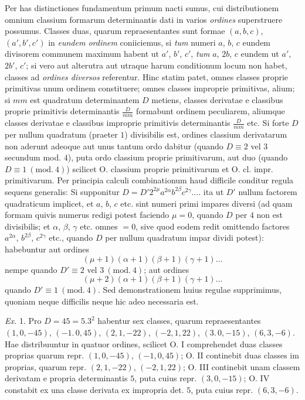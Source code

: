 Per has distinctiones fundamentum primum nacti sumus, cui distributionem omnium classium formarum determinantis dati in varios \textit{ordines} superstruere possumus. Classes duas, quarum repraesentantes sunt formae $(a,b,c)$, $(a',b',c')$ in \textit{eundem ordinem} coniiciemus, si \textit{tum} numeri $a$, $b$, $c$ eundem divisorem communem maximum habent ut $a'$, $b'$, $c'$, \textit{tum} $a$, $2b$, $c$ eundem ut $a'$, $2b'$, $c'$; si vero aut alterutra aut utraque harum conditionum locum non habet, classes ad \textit{ordines diversos} referentur. Hinc statim patet, omnes classes proprie primitivas unum ordinem constituere; omnes classes improprie primitivas, alium; si $mm$ est quadratum determinantem $D$ metiens, classes derivatae e classibus proprie primitivis determinantis $\frac{D}{mm}$ formabunt ordinem peculiarem, aliumque classes derivatae e classibus improprie primitivis determinantis $\frac{D}{mm}$ etc. Si forte $D$ per nullum quadratum (praeter $1$) divisibilis est, ordines classium derivatarum non aderunt adeoque aut unus tantum ordo dabitur (quando $D\equiv2$ vel $3$ secundum mod. $4$), puta ordo classium proprie primitivarum, aut duo (quando $D\equiv1\ (\mathrm{mod.}\ 4)$) scilicet O. classium proprie primitivarum et O. cl. impr. primitivarum. Per principia calculi combinationum haud difficile conditur regula sequens generalis: Si supponitur $D=D'2^{2\mu}a^{2\alpha}b^{2\beta}c^{2\gamma}\ldots.$ ita ut $D'$ nullum factorem quadraticum implicet, et $a$, $b$, $c$ etc. sint numeri primi impares diversi (ad quam formam quivis numerus redigi potest faciendo $\mu=0$, quando $D$ per $4$ non est divisibilis; et $\alpha$, $\beta$, $\gamma$ etc. omnes $=0$, sive quod eodem redit omittendo factores $a^{2\alpha}$, $b^{2\beta}$, $c^{2\gamma}$ etc., quando $D$ per nullum quadratum impar dividi potest): habebuntur aut ordines
\[
(\mu+1)(\alpha+1)(\beta+1)(\gamma+1)\ldots
\]
nempe quando $D'\equiv2$ vel $3\ (\mathrm{mod.}\ 4)$; aut ordines
\[
(\mu+2)(\alpha+1)(\beta+1)(\gamma+1)\ldots
\]
quando $D'\equiv1\ (\mathrm{mod.}\ 4)$. Sed demonstrationem huius regulae supprimimus, quoniam neque difficilis neque hic adeo necessaria est.

\textit{Ex.} 1. Pro $D=45=5.3^2$ habentur sex classes, quarum repraesentantes $(1,0,-45)$, $(-1.\,0,45)$, $(2,1,-22)$, $(-2,1,22)$, $(3.\,0,-15)$, $(6,3,-6)$. Hae distribuuntur in quatuor ordines, scilicet O. I comprehendet duas classes proprias quarum repr. $(1,0,-45)$, $(-1,0,45)$; O. II continebit duas classes im%
%
proprias, quarum repr. $(2,1,-22)$, $(-2,1,22)$; O. III continebit unam classem derivatam e propria determinantis $5$, puta cuius repr. $(3,0,-15)$; O. IV constabit ex una classe derivata ex impropria det. $5$, puta cuius repr. $(6,3,-6)$.

